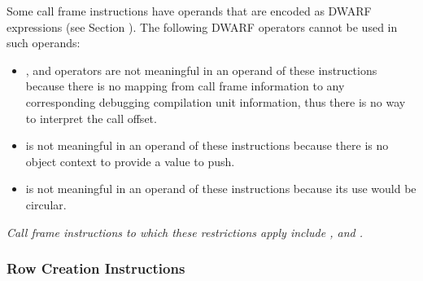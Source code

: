 Some call frame instructions have operands that are encoded
as DWARF expressions 
(see Section ). 
The following DWARF
operators cannot be used in such operands:


\begin{itemize}
\item {},  
and  operators
are not meaningful in an operand of these instructions
because there is no mapping from call frame information to
any corresponding debugging compilation unit information,
thus there is no way to interpret the call offset.

\item {} is not meaningful in an operand
of these instructions because there is no object context to
provide a value to push.

\item {} is not meaningful in an operand of
these instructions because its use would be circular.
\end{itemize}

\textit{Call frame instructions to which these restrictions apply
include , 
and .}

\subsubsection{Row Creation Instructions}
\label{chap:rowcreationinstructions}

